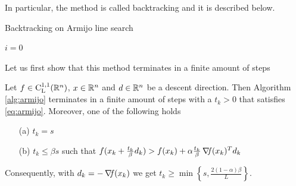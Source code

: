 \documentclass[10pt,a4paper]{article}
\begin{document}
In particular, the method is called backtracking and it is described below.
\begin{algorithm}[H]\label{alg:armijo}
	\caption{Backtracking on Armijo line search}
	
	
	$i=0$	
	
	
\end{algorithm}
\noindent Let us first show that this method terminates in a finite amount of steps
\begin{lemma} \label{lemma:finite_termination}
	Let $f\in \mathord{\mathrm{C^{1,1}_{L}}}(\mathbb{R}^n)$, $x\in \mathbb{R}^n$ and $d\in \mathbb{R}^n$ be a descent direction. Then Algorithm \ref{alg:armijo} terminates in a finite amount of steps with a $t_k>0$ that satisfies \eqref{eq:armijo}. Moreover, one of the following holds
	\begin{itemize}
		\item[(a)] $t_k=s$
		\item[(b)] $t_k\leq \beta s$ such that $f(x_k +\frac{t_k}{\beta} d_k) > f(x_k) + \alpha \frac{t_k}{\beta} \operatorname*{\mathit{\nabla \!f}}(x_k)^Td_k$
	\end{itemize}
Consequently, with $d_k = -\operatorname*{\mathit{\nabla \!f}}(x_k)$ we get $t_k \geq \min \left\{s, \frac{2(1-\alpha)\beta}{L} \right \}$.
\end{lemma}
\end{document}
